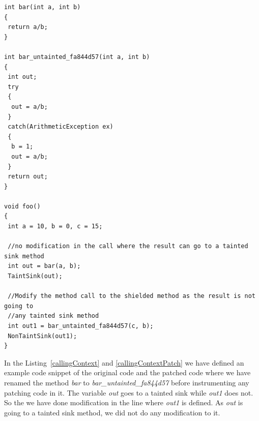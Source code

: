 \begin{lstlisting}
int bar(int a, int b)
{
 return a/b;
}

int bar_untainted_fa844d57(int a, int b)
{
 int out;
 try
 {
  out = a/b;
 }
 catch(ArithmeticException ex)
 {
  b = 1;
  out = a/b;
 }
 return out;
}

void foo()
{
 int a = 10, b = 0, c = 15;
 
 //no modification in the call where the result can go to a tainted sink method
 int out = bar(a, b);
 TaintSink(out);
 
 //Modify the method call to the shielded method as the result is not going to
 //any tainted sink method 
 int out1 = bar_untainted_fa844d57(c, b);
 NonTaintSink(out1);
}

\end{lstlisting}

In the Listing~\ref{callingContext} and \ref{callingContextPatch} we have
defined an example code snippet of the original code and the patched code where
we have renamed the method \emph{bar} to \emph{bar\_untainted\_fa844d57}
before instrumenting any patching code in it. The variable \emph{out} goes to a
tainted sink while \emph{out1} does not. So the we have done modification in the
line where \emph{out1} is defined. As \emph{out} is going to a tainted sink
method, we did not do any modification to it.







